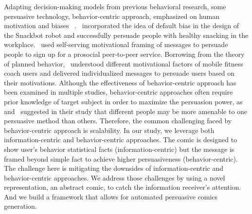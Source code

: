 Adapting decision-making models from previous behavioral research, some persuasive technology, behavior-centric approach, emphasized on human motivation and biases ~\cite{LeeKF11}.~\textcite{LeeKF11} incorporated the idea of default bias in the design of the Snackbot robot and successfully persuade people with healthy snacking in the workplace.~\textcite{vaish2018s} used self-serving motivational framing of messages to persuade people to sign up for a prosocial peer-to-peer service. Borrowing from the theory of planned behavior,~\textcite{schneider2016understanding} understood different motivational factors of mobile fitness coach users and delivered individualized messages to persuade users based on their motivations. Although the effectiveness of behavior-centric approach has been examined in multiple studies, behavior-centric approaches often require prior knowledge of target subject in order to maximize the persuasion power, as~\textcite{orji2014developing} and~\textcite{schneider2016understanding} suggested in their study that different people may be more amenable to one persuasive method than others. Therefore, the common challenging faced by behavior-centric approach is scalability. In our study, we leverage both information-centric and behavior-centric approaches. The comic is designed to show user's behavior statistical facts (information-centric) but the message is framed beyond simple fact to achieve higher persuasiveness (behavior-centric). The challenge here is mitigating the downsides of information-centric and behavior-centric approaches. We address those challenges by using a novel representation, an abstract comic, to catch the information receiver's attention. And we build a framework that allows for  automated persuasive comics generation.

